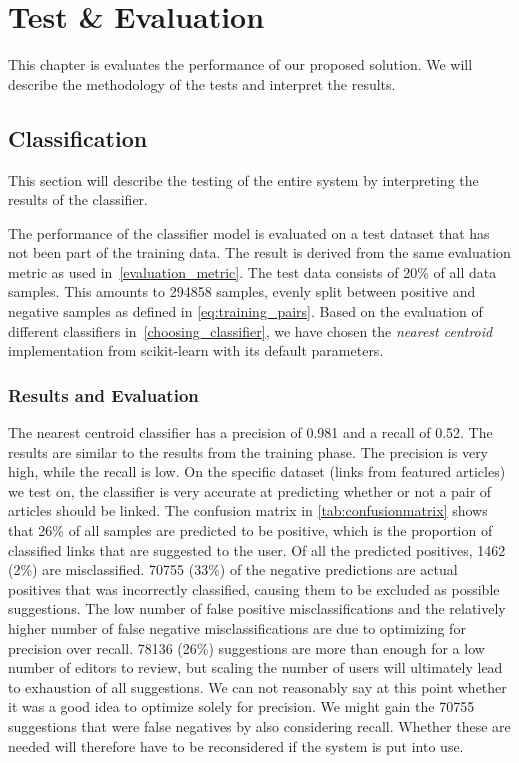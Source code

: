 \chapter{Test \& Evaluation}\label{chap:testeval}
This chapter is evaluates the performance of our proposed solution. We will describe the methodology of the tests and interpret the results.

\section{Classification}
This section will describe the testing of the entire system by interpreting the results of the classifier.

The performance of the classifier model is evaluated on a test dataset that has not been part of the training data. The result is derived from the same evaluation metric as used in~\cref{evaluation_metric}. The test data consists of 20\% of all data samples. This amounts to \num{294858} samples, evenly split between positive and negative samples as defined in \cref{eq:training_pairs}. Based on the evaluation of different classifiers in~\cref{choosing_classifier}, we have chosen the \emph{nearest centroid} implementation from scikit-learn with its default parameters.

\subsection{Results and Evaluation}
The nearest centroid classifier has a precision of \num{0.981} and a recall of \num{0.52}. The results are similar to the results from the training phase. The precision is very high, while the recall is low. On the specific dataset (links from featured articles) we test on, the classifier is very accurate at predicting whether or not a pair of articles should be linked. The confusion matrix in \cref{tab:confusionmatrix} shows that 26\% of all samples are predicted to be positive, which is the proportion of classified links that are suggested to the user.  Of all the predicted positives, \num{1462} (2\%) are misclassified. \num{70755} (33\%) of the negative predictions are actual positives that was incorrectly classified, causing them to be excluded as possible suggestions. The low number of false positive misclassifications and the relatively higher number of false negative misclassifications are due to optimizing for precision over recall.  \num{78136} (26\%) suggestions are more than enough for a low number of editors to review, but scaling the number of users will ultimately lead to exhaustion of all suggestions. We can not reasonably say at this point whether it was a good idea to optimize solely for precision. We might gain the \num{70755} suggestions that were false negatives by also considering recall. Whether these are needed will therefore have to be reconsidered if the system is put into use.

